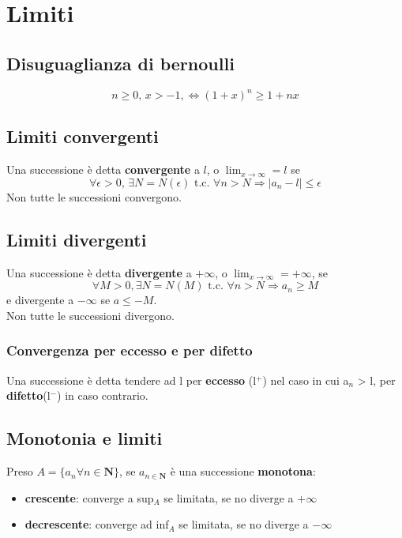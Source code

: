 \documentclass{report}
\begin{document}
\section{Limiti}
    \subsection{Disuguaglianza di bernoulli}
        $$n \geq 0,\, x > -1, \Longleftrightarrow \left(1+x\right)^n \geq 1 + nx$$
    \subsection{Limiti convergenti}
        Una successione è detta \textbf{convergente} a $l$, o $\lim_{x \to \infty} = l$ se 
        $$\forall\epsilon > 0,\, \exists N = N\left(\epsilon\right) \textrm{ t.c. } \forall n > N \Longrightarrow
        |a_n - l| \leq \epsilon$$
        Non tutte le successioni convergono.
    \subsection{Limiti divergenti}
        Una successione è detta \textbf{divergente} a $+\infty$, o 
        $\lim_{x \to \infty} = +\infty$, se $$\forall M > 0, \exists N = N\left(M\right)
        \textrm{ t.c. } \forall n > N \Longrightarrow a_n \geq M$$ e divergente a 
        $-\infty$ se $a \leq -M$. \\
        Non tutte le successioni divergono.
        \subsubsection{Convergenza per eccesso e per difetto}
            Una successione è detta tendere ad l per \textbf{eccesso} (l$^+$) nel caso 
            in cui a$_n$ > l, per \textbf{difetto}(l$^-$) in caso contrario.
    \subsection{Monotonia e limiti}
        Preso $A = \{a_n \forall n \in \mathbf{N}\}$, se $a_{n \in \mathbf{N}}$ è una successione \textbf{monotona}:
        \begin{itemize}
            \item \textbf{crescente}: converge a sup$_A$ se limitata, se no diverge a $+\infty$
            \item \textbf{decrescente}: converge ad inf$_A$ se limitata, se no diverge a $-\infty$
        \end{itemize}
\end{document}
